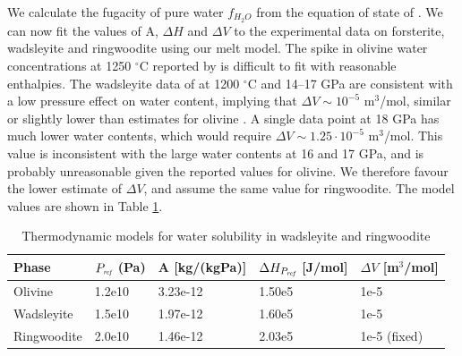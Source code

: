 \documentclass[review]{elsarticle}
\begin{document}
We calculate the fugacity of pure water $f_{H_2O}$ from the equation of state of \citep{PS1995}. We can now fit the values of A, $\Delta H$ and $\Delta V$ to the experimental data on forsterite, wadsleyite and ringwoodite using our melt model. The spike in olivine water concentrations at 1250 $^{\circ}$C reported by \cite{SFNHB2006} is difficult to fit with reasonable enthalpies. The wadsleyite data of \cite{DDFK2005} at 1200 $^{\circ}$C and 14--17 GPa are consistent with a low pressure effect on water content, implying that $\Delta V \sim 10^{-5}$ m$^3$/mol, similar or slightly lower than estimates for olivine \citep[1.00 -- 1.06 $\cdot 10^{-5}$ m$^3$/mol][]{KKR1996, ZGK2004, MDAR2006}. A single data point at 18 GPa has much lower water contents, which would require $\Delta V \sim 1.25 \cdot 10^{-5}$ m$^3$/mol. This value is inconsistent with the large water contents at 16 and 17 GPa, and is probably unreasonable given the reported values for olivine. We therefore favour the lower estimate of $\Delta V$, and assume the same value for ringwoodite. The model values are shown in Table \ref{table:partitioning}.

\begin{table}[]
\centering
\caption{Thermodynamic models for water solubility in wadsleyite and ringwoodite}
\label{table:partitioning}
\begin{tabular}{lllll}
Phase & $P_{\textit{\tiny{ref}}}$ (Pa) & A [kg/(kgPa)] & $\Delta H_{P_{\textit{\tiny{ref}}}}$ [J/mol] & $\Delta V$ [m$^3$/mol] \\
\hline
Olivine & 1.2e10 & 3.23e-12 & 1.50e5 & 1e-5 \\
Wadsleyite & 1.5e10 & 1.97e-12 & 1.60e5 & 1e-5 \\
Ringwoodite & 2.0e10 & 1.46e-12 & 2.03e5 & 1e-5 (fixed)
\end{tabular}
\end{table}
\end{document}
